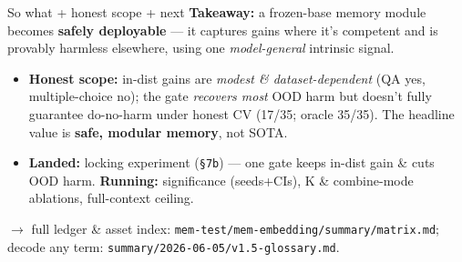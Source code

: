 \begin{frame}{So what + honest scope + next}
  \textbf{Takeaway:} a frozen-base memory module becomes \textbf{safely deployable} --- it captures gains where it's competent and is provably harmless elsewhere, using one \emph{model-general} intrinsic signal.
  \vspace{0.6em}
  \begin{itemize}\small
    \item \textbf{Honest scope:} in-dist gains are \emph{modest \& dataset-dependent} (QA yes, multiple-choice no); the gate \emph{recovers most} OOD harm but doesn't fully guarantee do-no-harm under honest CV (17/35; oracle 35/35). The headline value is \textbf{safe, modular memory}, not SOTA.
    \item \textbf{Landed:} locking experiment (\texttt{\S7b}) --- one gate keeps in-dist gain \& cuts OOD harm. \textbf{Running:} significance (seeds+CIs), K \& combine-mode ablations, full-context ceiling.
  \end{itemize}
  \vspace{0.5em}
  \footnotesize $\rightarrow$ full ledger \& asset index: \texttt{mem-test/mem-embedding/summary/matrix.md}; decode any term: \texttt{summary/2026-06-05/v1.5-glossary.md}.
\end{frame}
